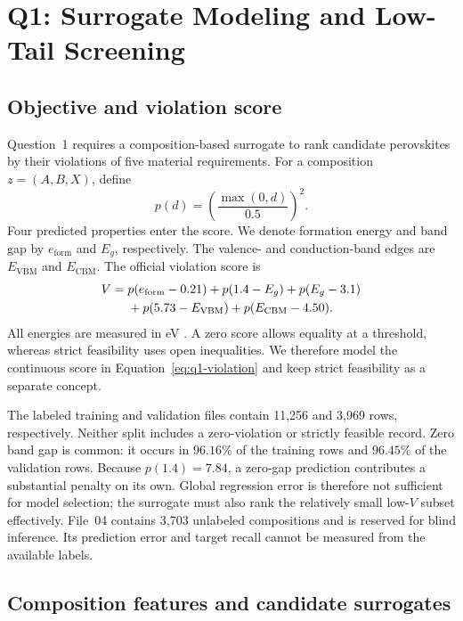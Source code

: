 \section{Q1: Surrogate Modeling and Low-Tail Screening}
\label{sec:q1-surrogate}

\subsection{Objective and violation score}

Question~1 requires a composition-based surrogate to rank candidate
perovskites by their violations of five material requirements.  For a
composition $z=(A,B,X)$, define
\begin{equation}
  p(d)=\left(\frac{\max(0,d)}{0.5}\right)^2 .
  \label{eq:q1-hinge}
\end{equation}
Four predicted properties enter the score.  We denote formation energy and
band gap by $e_{\mathrm{form}}$ and $E_g$, respectively.  The valence- and
conduction-band edges are $E_{\mathrm{VBM}}$ and $E_{\mathrm{CBM}}$.  The
official violation score is
\begin{align}
  V={}&p(e_{\mathrm{form}}-0.21)
      +p(1.4-E_g)+p(E_g-3.1) \notag\\
     &+p(5.73-E_{\mathrm{VBM}})
      +p(E_{\mathrm{CBM}}-4.50).
  \label{eq:q1-violation}
\end{align}
All energies are measured in eV \cite{apmcm2026problemD}.  A zero score
allows equality at a threshold, whereas strict feasibility uses open
inequalities.  We therefore model the continuous score in
Equation~\eqref{eq:q1-violation} and keep strict feasibility as a separate
concept.

The labeled training and validation files contain 11,256 and 3,969 rows,
respectively.  Neither split includes a zero-violation or strictly feasible
record.  Zero band gap is common: it occurs in $96.16\%$ of the training
rows and $96.45\%$ of the validation rows.  Because $p(1.4)=7.84$, a
zero-gap prediction contributes a substantial penalty on its own.  Global
regression error is therefore not sufficient for model selection; the
surrogate must also rank the relatively small low-$V$ subset effectively.
File~04 contains 3,703 unlabeled compositions and is reserved for blind
inference.  Its prediction error and target recall cannot be measured from
the available labels.

\subsection{Composition features and candidate surrogates}

